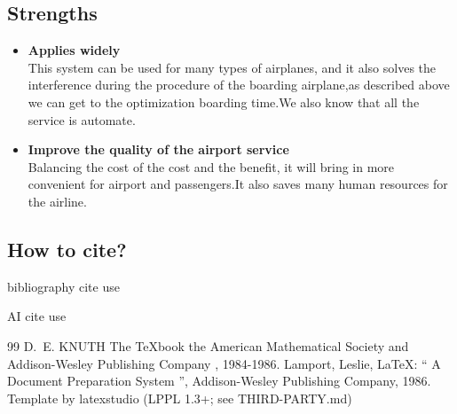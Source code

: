 \documentclass{mcmthesis}
\begin{document}
\subsection{Strengths}
\begin{itemize}
\item \textbf{Applies widely}\\
This  system can be used for many types of airplanes, and it also
solves the interference during  the procedure of the boarding
airplane,as described above we can get to the  optimization
boarding time.We also know that all the service is automate.
\item \textbf{Improve the quality of the airport service}\\
Balancing the cost of the cost and the benefit, it will bring in
more convenient  for airport and passengers.It also saves many
human resources for the airline. 
\end{itemize}

\subsection{How to cite?}
bibliography cite use \cite{1,2,3} 

AI cite use 

\begin{thebibliography}{99}
 D.~E. KNUTH   The \TeX{}book  the American
Mathematical Society and Addison-Wesley
Publishing Company , 1984-1986.
Lamport, Leslie,  \LaTeX{}: `` A Document Preparation System '',
Addison-Wesley Publishing Company, 1986.
 Template by latexstudio (LPPL 1.3+; see THIRD-PARTY.md) 
\end{thebibliography}
\end{document}
